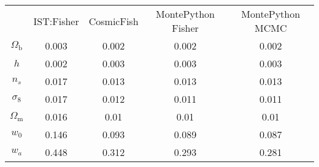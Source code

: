 \begin{table}
\centering
\begin{tabular}{|c|c|c|c|c|}
 & IST:Fisher & CosmicFish & MontePython Fisher & MontePython MCMC \\
$\Omega_\mathrm{b}$ & 0.003 & 0.002 & 0.002 & 0.002 \\
$h$ & 0.002 & 0.003 & 0.003 & 0.003 \\
$n_s$ & 0.017 & 0.013 & 0.013 & 0.013 \\
$\sigma_8$ & 0.017 & 0.012 & 0.011 & 0.011 \\
$\Omega_\mathrm{m}$ & 0.016 & 0.01 & 0.01 & 0.01 \\
$w_0$ & 0.146 & 0.093 & 0.089 & 0.087 \\
$w_a$ & 0.448 & 0.312 & 0.293 & 0.281 \\
\end{tabular}
\end{table}
